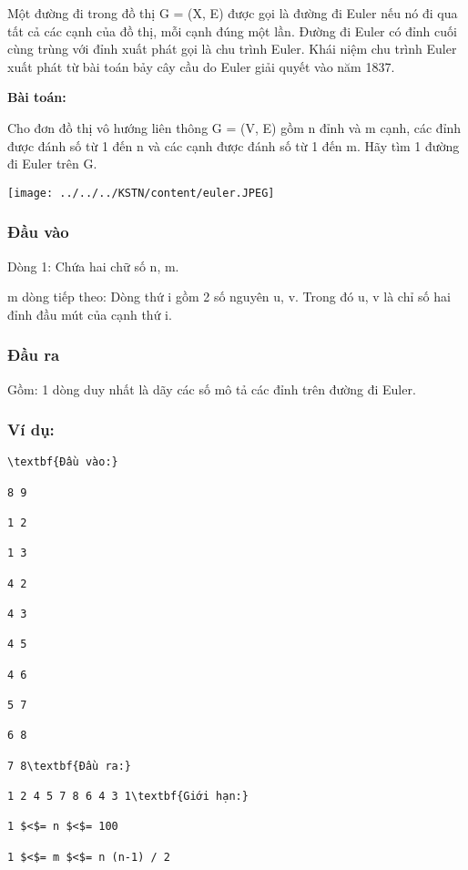 

Một đường đi trong đồ thị G = (X, E) được gọi là đường đi Euler nếu nó đi qua tất cả các cạnh của đồ thị, mỗi cạnh đúng một lần. Đường đi Euler có đỉnh cuối cùng trùng với đỉnh xuất phát gọi là chu trình Euler. Khái niệm chu trình Euler xuất phát từ bài toán bảy cây cầu do Euler giải quyết vào năm 1837. 

\textbf{Bài toán:}

Cho đơn đồ thị vô hướng liên thông G = (V, E) gồm n đỉnh và m cạnh, các đỉnh được đánh số từ 1 đến n và các cạnh được đánh số từ 1 đến m. Hãy tìm 1 đường đi Euler trên G.


\texttt{[image: ../../../KSTN/content/euler.JPEG]}

\subsubsection{Đầu vào}

Dòng 1: Chứa hai chữ số n, m.

m dòng tiếp theo: Dòng thứ i gồm 2 số nguyên u, v. Trong đó u, v là chỉ số hai đỉnh đầu mút của cạnh thứ i.

\subsubsection{Đầu ra}

Gồm: 1 dòng duy nhất là dãy các số mô tả các đỉnh trên đường đi Euler.

\subsubsection{Ví dụ:}
\begin{verbatim}
\textbf{Đầu vào:}

8 9

1 2

1 3

4 2

4 3

4 5

4 6

5 7

6 8

7 8\textbf{Đầu ra:}

1 2 4 5 7 8 6 4 3 1\textbf{Giới hạn:}

1 $<$= n $<$= 100

1 $<$= m $<$= n (n-1) / 2\end{verbatim}